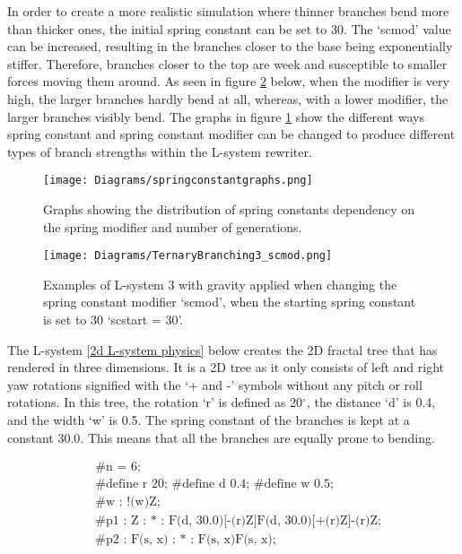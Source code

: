\noindent
In order to create a more realistic simulation where thinner branches bend more than thicker ones, the initial spring constant can be set to 30. The `scmod' value can be increased, resulting in the branches closer to the base being exponentially stiffer. Therefore, branches closer to the top are week and susceptible to smaller forces moving them around. As seen in figure \ref{increasing scmod} below, when the modifier is very high, the larger branches hardly bend at all, whereas, with a lower modifier, the larger branches visibly bend. The graphs in figure \ref{spring constant graphs} show the different ways spring constant and spring constant modifier can be changed to produce different types of branch strengths within the L-system rewriter.

\begin{figure}[htbp]
	{\centering
		\vspace{7px}
		\texttt{[image: Diagrams/springconstantgraphs.png]}
		\caption{Graphs showing the distribution of spring constants dependency on the spring modifier and number of generations.}\label{spring constant graphs}
	}
\end{figure}
\FloatBarrier

\begin{figure}[htbp]
	{\centering
		\vspace{7px}
		\texttt{[image: Diagrams/TernaryBranching3\_scmod.png]}
		\caption{Examples of L-system 3 with gravity applied when changing the spring constant modifier `scmod', when the starting spring constant is set to 30 `scstart = 30'.}\label{increasing scmod}
	}
\end{figure}
\FloatBarrier

\noindent
The L-system \ref{2d L-system physics} below creates the 2D fractal tree that has rendered in three dimensions. It is a 2D tree as it only consists of left and right yaw rotations signified with the `+ and -' symbols without any pitch or roll rotations. In this tree, the rotation `r' is defined as 20$^{\circ}$, the distance `d' is 0.4, and the width `w' is 0.5. The spring constant of the branches is kept at a constant 30.0. This means that all the branches are equally prone to bending. 

\begin{singlespace}
\begin{equation} \label{2d L-system physics}
\begin{aligned}
	&\textrm{\#n = 6;} \\
	&\textrm{\#define r 20; \#define d 0.4; \#define w 0.5;}\\
	&\textrm{\#w : !(w)Z;}\\
	&\textrm{\#p1 : Z : * : F(d, 30.0)[-(r)Z]F(d, 30.0)[+(r)Z]-(r)Z;}\\
	&\textrm{\#p2 : F(s, x) : * : F(s, x)F(s, x);}
\end{aligned}
\end{equation}
\end{singlespace}

